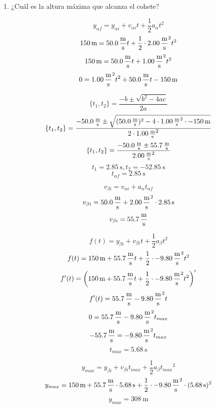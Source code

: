 \documentclass[Física - Práctica.root.tex]{subfiles}
\begin{document}
\begin{enumerate}
        \begin{enumerate}
          \item ¿Cuál es la altura máxima que alcanza el cohete?

                \begin{multicols}{2}
                  \[y_{\alpha f}=y_{\alpha i}+v_{\alpha i}t+\frac{1}{2}a_\alpha t^2\]
                  \[\SI{150}{\meter}=\SI{50,0}{\meter\over\second}t+\frac{1}{2}\cdot\SI{2,00}{\meter\over\second\squared}t^2\]
                  \[\SI{150}{\meter}=\SI{50,0}{\meter\over\second}t+\SI{1,00}{\meter\over\second\squared}t^2\]
                  \[0=\SI{1,00}{\meter\over\second\squared}t^2+\SI{50,0}{\meter\over\second}t-\SI{150}{\meter}\]

                  \[\{t_1,t_2\}=\frac{-b\pm\sqrt{b^2-4ac}}{2a}\]
                  \[\{t_1,t_2\}=\frac{\SI{-50,0}{\meter\over\second}\pm\sqrt{(\SI{50,0}{\meter\over\second})^2-4\cdot\SI{1,00}{\meter\over\second\squared}\cdot-\SI{150}{\meter}}}{2\cdot\SI{1,00}{\meter\over\second\squared}}\]
                  \[\{t_1,t_2\}=\frac{\SI{-50,0}{\meter\over\second}\pm\SI{55,7}{\meter\over\second}}{\SI{2,00}{\meter\over\second\squared}}\]
                  \[t_1=\SI{2.85}{\second}, t_2=\SI{-52,85}{\second}\]
                  \[t_{\alpha f}=\SI{2.85}{\second}\]

                  \[v_{\beta i}=v_{\alpha i}+a_\alpha t_{\alpha f}\]
                  \[v_{\beta i}=\SI{50,0}{\meter\over\second}+\SI{2,00}{\meter\over\second\squared}\cdot\SI{2.85}{\second}\]
                  \[v_{\beta i}=\SI{55,7}{\meter\over\second}\]

                  \[f(t)=y_{\beta i}+v_{\beta i}t+\frac{1}{2}a_\beta t^2\]
                  \[f(t)=\SI{150}{\meter}+\SI{55,7}{\meter\over\second}t+\frac{1}{2}\cdot\SI{-9,80}{\meter\over\second\squared}t^2\]
                  \[f'(t)=\left(\SI{150}{\meter}+\SI{55,7}{\meter\over\second}t+\frac{1}{2}\cdot\SI{-9,80}{\meter\over\second\squared}t^2\right)'\]
                  \[f'(t)=\SI{55,7}{\meter\over\second}-\SI{9,80}{\meter\over\second\squared}t\]
                  \[0=\SI{55,7}{\meter\over\second}-\SI{9,80}{\meter\over\second\squared}t_{max}\]
                  \[\SI{-55,7}{\meter\over\second}=\SI{-9,80}{\meter\over\second\squared}t_{max}\]
                  \[t_{max}=\SI{5,68}{\second}\]

                  \[y_{max}=y_{\beta i}+v_{\beta i}t_{max}+\frac{1}{2}a_\beta{t_{max}}^2\]
                  \[y_{max}=\SI{150}{\meter}+\SI{55,7}{\meter\over\second}\cdot\SI{5,68}{\second}+\frac{1}{2}\cdot\SI{-9,80}{\meter\over\second\squared}\cdot(\SI{5,68}{\second})^2\]
                  \[y_{max}=\boxed{\SI{308}{\meter}}\]
                \end{multicols}


\end{enumerate}
\end{enumerate}
\end{document}
